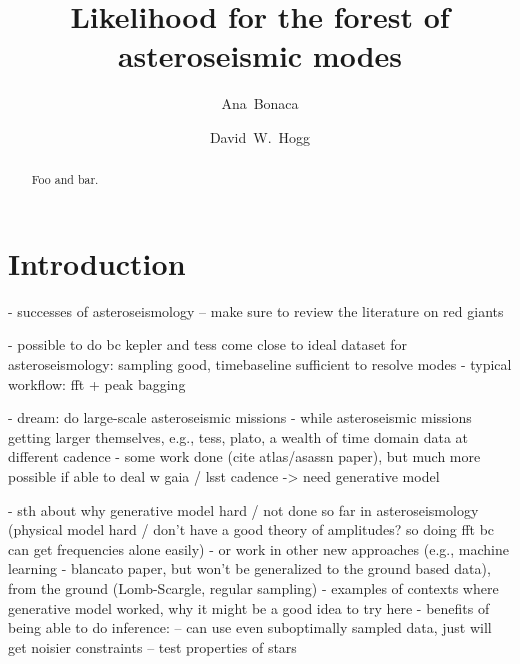 \documentclass[modern]{aastex63}
\begin{document}
\sloppy\sloppypar\raggedbottom\frenchspacing %

\title{Likelihood for the forest of asteroseismic modes}


\author[0000-0002-7846-9787]{Ana~Bonaca}

\author[0000-0003-2866-9403]{David~W.~Hogg}

\begin{abstract}\noindent %
Foo and bar.
\end{abstract}

\section{Introduction}
\label{sec:intro}

- successes of asteroseismology
-- make sure to review the literature on red giants

- possible to do bc kepler and tess come close to ideal dataset for asteroseismology: sampling good, timebaseline sufficient to resolve modes
- typical workflow: fft + peak bagging

- dream: do large-scale asteroseismic missions
- while asteroseismic missions getting larger themselves, e.g., tess, plato, a wealth of time domain data at different cadence
- some work done (cite atlas/asassn paper), but much more possible if able to deal w gaia / lsst cadence
-> need generative model

- sth about why generative model hard / not done so far in asteroseismology (physical model hard / don't have a good theory of amplitudes? so doing fft bc can get frequencies alone easily)
- or work in other new approaches (e.g., machine learning - blancato paper, but won't be generalized to the ground based data), from the ground (Lomb-Scargle, regular sampling)
- examples of contexts where generative model worked, why it might be a good idea to try here
- benefits of being able to do inference:
-- can use even suboptimally sampled data, just will get noisier constraints
-- test properties of stars
\end{document}
